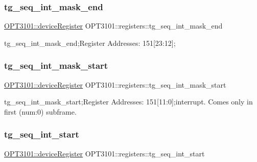 \subsubsection{\texorpdfstring{tg\+\_\+seq\+\_\+int\+\_\+mask\+\_\+end}{tg\_seq\_int\_mask\_end}}
{\footnotesize\ttfamily \mbox{\hyperlink{class_o_p_t3101_1_1device_register}{O\+P\+T3101\+::device\+Register}} O\+P\+T3101\+::registers\+::tg\+\_\+seq\+\_\+int\+\_\+mask\+\_\+end}



tg\+\_\+seq\+\_\+int\+\_\+mask\+\_\+end;Register Addresses\+: 151\mbox{[}23\+:12\mbox{]}; 

\mbox{\label{class_o_p_t3101_1_1registers_a6a07f581e0aea372246d40ab03ef4b5d}} 
\subsubsection{\texorpdfstring{tg\+\_\+seq\+\_\+int\+\_\+mask\+\_\+start}{tg\_seq\_int\_mask\_start}}
{\footnotesize\ttfamily \mbox{\hyperlink{class_o_p_t3101_1_1device_register}{O\+P\+T3101\+::device\+Register}} O\+P\+T3101\+::registers\+::tg\+\_\+seq\+\_\+int\+\_\+mask\+\_\+start}



tg\+\_\+seq\+\_\+int\+\_\+mask\+\_\+start;Register Addresses\+: 151\mbox{[}11\+:0\mbox{]};interrupt. Comes only in first (num\+:0) subframe. 

\mbox{\label{class_o_p_t3101_1_1registers_a0a60b0f7f4db214f884dd21be76e47d1}} 
\subsubsection{\texorpdfstring{tg\+\_\+seq\+\_\+int\+\_\+start}{tg\_seq\_int\_start}}
{\footnotesize\ttfamily \mbox{\hyperlink{class_o_p_t3101_1_1device_register}{O\+P\+T3101\+::device\+Register}} O\+P\+T3101\+::registers\+::tg\+\_\+seq\+\_\+int\+\_\+start}



